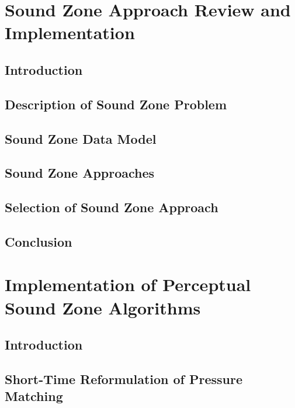 \documentclass[10pt,twoside,openright,titlepage]{ce}
\begin{document}
\chapter{Sound Zone Approach Review and Implementation}
\label{ch:sound_zone}
\section{Introduction}
\label{ch:sound_zone:introduction}

\newpage
\section{Description of Sound Zone Problem}
\label{ch:sound_zone:problem}

\newpage
\section{Sound Zone Data Model}
\label{ch:sound_zone:data_model}

\newpage
\section{Sound Zone Approaches}
\label{ch:sound_zone:approaches}

\newpage
\section{Selection of Sound Zone Approach}
\label{ch:sound_zone:approach_selection}

\newpage
\section{Conclusion}
\label{ch:sound_zone:conclusion}


\chapter{Implementation of Perceptual Sound Zone Algorithms}
\label{ch:perceptual_sound_zone}
\section{Introduction}
\label{ch:perceptual_sound_zone:introduction}

\newpage
\section{Short-Time Reformulation of Pressure Matching}
\label{ch:perceptual_sound_zone:block_based}

\newpage
\end{document}
